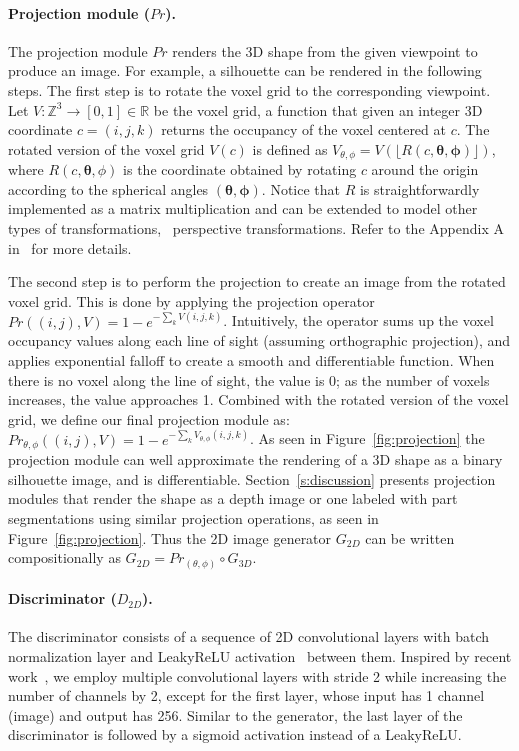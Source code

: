 \paragraph*{Projection module ($Pr$).}
The projection module $Pr$ renders the 3D shape from the given
viewpoint to produce an image. 
For example, a silhouette can be
rendered in the following steps.
The first step is to rotate the voxel grid to the corresponding viewpoint.
Let $V : \mathbb{Z}^3 \rightarrow [0,1] \in \mathbb{R}$ be the voxel grid, a function that
given an integer 3D coordinate $c=(i,j,k)$ returns the occupancy of the voxel centered at $c$.
The rotated version of the voxel grid $V(c)$ is defined as 
$V_{\mathbb{\theta, \phi}} = V(\lfloor{R(c, \mathbf{\theta,\phi})}\rfloor)$,
where $R(c, \mathbf{\theta},\phi)$ is the coordinate obtained by rotating $c$ around the origin
according to the spherical angles $\mathbf{(\theta,\phi)}$. 
Notice that $R$ is straightforwardly implemented as a matrix multiplication and can be
extended to model other types of transformations, \eg~perspective transformations.
Refer to the Appendix A in~\cite{yan2016perspective} for more details.

The second step is to perform the projection to create an image from
the rotated voxel grid.
This is done by applying the projection operator 
$Pr((i,j),V) = 1 - e^{-\sum_{k}V(i,j,k)}$. 
Intuitively, the operator sums up the voxel occupancy values along
each line of sight (assuming orthographic projection), and applies
exponential falloff to create a smooth and differentiable
function.
When there is no voxel along the line of sight, the value is
0; as the number of voxels increases, the value approaches 1.
Combined with the rotated version of the voxel grid, we define our
final projection module as:
$Pr_{\theta,\phi}((i,j),V) = 1 - e^{-\sum_{k}V_{\theta,\phi}(i,j,k)}$. 
As seen in Figure~\ref{fig:projection} the projection module can well
approximate the rendering of a 3D shape as a binary silhouette image,
and is differentiable.
Section~\ref{s:discussion} presents projection modules that
render the shape as a depth image or one labeled with part segmentations
using similar projection operations, as seen in Figure~\ref{fig:projection}. 
Thus the 2D image generator $G_{2D}$ can be written compositionally as
${G}_{2D} = {Pr}_{(\theta, \phi)} \circ G_{3D}$.

\paragraph*{Discriminator ($D_{2D}$).}
The discriminator consists of a sequence of 2D convolutional layers with
batch normalization layer and LeakyReLU activation~\cite{maas2013rectifier} between them. 
Inspired by recent work~\cite{radford2015unsupervised,wu2016learning}, we employ
multiple convolutional layers with stride 2 while increasing the
number of channels by 2, except for the first layer,
whose input has 1 channel (image) and output has 256.
Similar to the generator, the last layer of the discriminator is
followed by a sigmoid activation instead of a LeakyReLU.

